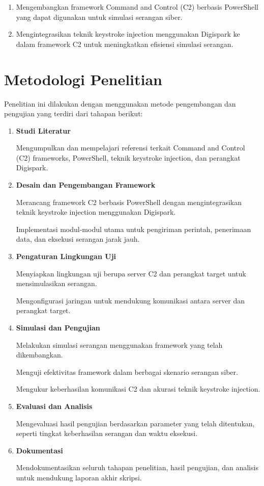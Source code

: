 \begin{enumerate}
    \item Mengembangkan framework Command and Control (C2) berbasis PowerShell yang dapat digunakan untuk simulasi serangan siber.
    \item Mengintegrasikan teknik keystroke injection menggunakan Digispark ke dalam framework C2 untuk meningkatkan efisiensi simulasi serangan.
\end{enumerate}

\section{Metodologi Penelitian}
Penelitian ini dilakukan dengan menggunakan metode pengembangan dan pengujian yang terdiri dari tahapan berikut:

 \begin{enumerate}
     \item \textbf{Studi Literatur}

Mengumpulkan dan mempelajari referensi terkait Command and Control (C2) frameworks, PowerShell, teknik keystroke injection, dan perangkat Digispark.

\item \textbf{Desain dan Pengembangan Framework}

Merancang framework C2 berbasis PowerShell dengan mengintegrasikan teknik keystroke injection menggunakan Digispark.

Implementasi modul-modul utama untuk pengiriman perintah, penerimaan data, dan eksekusi serangan jarak jauh.

 
\item \textbf{Pengaturan Lingkungan Uji}

Menyiapkan lingkungan uji berupa server C2 dan perangkat target untuk mensimulasikan serangan.

 Mengonfigurasi jaringan untuk mendukung komunikasi antara server dan perangkat target.

 
\item \textbf{Simulasi dan Pengujian}

Melakukan simulasi serangan menggunakan framework yang telah dikembangkan.

 Menguji efektivitas framework dalam berbagai skenario serangan siber.

 Mengukur keberhasilan komunikasi C2 dan akurasi teknik keystroke injection.

 
\item \textbf{Evaluasi dan Analisis}

Mengevaluasi hasil pengujian berdasarkan parameter yang telah ditentukan, seperti tingkat keberhasilan serangan dan waktu eksekusi.

\item \textbf{Dokumentasi}

Mendokumentasikan seluruh tahapan penelitian, hasil pengujian, dan analisis untuk mendukung laporan akhir skripsi. 

 \end{enumerate}



